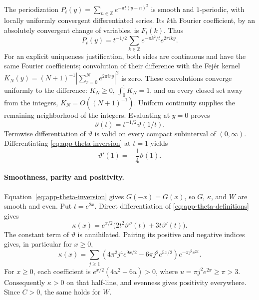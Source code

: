 The periodization
$P_t(y)=\sum_{n\in\mathbb Z}e^{-\pi t(y+n)^2}$ is smooth and
$1$-periodic, with locally uniformly convergent differentiated series.
Its $k$th Fourier coefficient, by an absolutely convergent change of
variables, is $F_t(k)$.  Thus
\[
 P_t(y)=t^{-1/2}\sum_{k\in\mathbb Z}
                  e^{-\pi k^2/t}e^{2\pi i k y}.
\]
For an explicit uniqueness justification, both sides are continuous and
have the same Fourier coefficients; convolution of their difference with
the Fej\'er kernel
$K_N(y)=(N+1)^{-1}|\sum_{r=0}^Ne^{2\pi i r y}|^2$ is zero.
These convolutions converge uniformly to the difference: $K_N\ge0$,
$\int_0^1K_N=1$, and on every closed set away from the integers,
$K_N=O((N+1)^{-1})$.  Uniform continuity supplies the remaining
neighborhood of the integers.  Evaluating at $y=0$ proves
\begin{equation}\label{eq:app-theta-inversion}
 \vartheta(t)=t^{-1/2}\vartheta(1/t).
\end{equation}
Termwise differentiation of $\vartheta$ is valid on every compact
subinterval of $(0,\infty)$.  Differentiating
\eqref{eq:app-theta-inversion} at $t=1$ yields
\begin{equation}\label{eq:app-theta-derivative-one}
 \vartheta'(1)=-\frac14\vartheta(1).
\end{equation}

\paragraph{Smoothness, parity and positivity.}
Equation~\eqref{eq:app-theta-inversion} gives $G(-x)=G(x)$, so $G$,
$\kappa$, and $W$ are smooth and even.  Put $t=e^{2x}$.  Direct
differentiation of \eqref{eq:app-theta-definitions} gives
\begin{equation}\label{eq:app-theta-kappa-derivative}
 \kappa(x)=e^{x/2}\bigl(2t^2\vartheta''(t)+3t\vartheta'(t)\bigr).
\end{equation}
The constant term of $\vartheta$ is annihilated.  Pairing its positive and
negative indices gives, in particular for $x\ge0$,
\begin{equation}\label{eq:app-theta-kappa-series}
 \kappa(x)=\sum_{j\ge1}
 \left(4\pi^2j^4e^{9x/2}-6\pi j^2e^{5x/2}\right)
             e^{-\pi j^2e^{2x}}.
\end{equation}
For $x\ge0$, each coefficient is
$e^{x/2}(4u^2-6u)>0$, where $u=\pi j^2e^{2x}\ge\pi>3$.
Consequently $\kappa>0$ on that half-line, and evenness gives positivity
everywhere.  Since $C>0$, the same holds for $W$.

